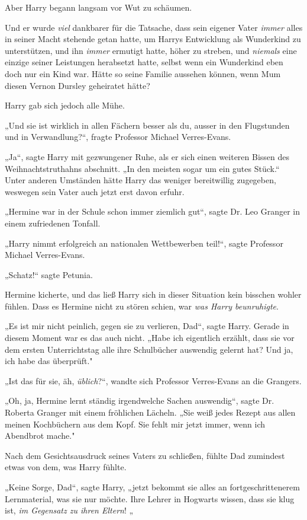 {Aber Harry begann langsam vor Wut zu schäumen.

Und er wurde \emph{viel} dankbarer für die Tatsache, dass sein eigener Vater \emph{immer} alles in seiner Macht stehende getan hatte, um Harrys Entwicklung als Wunderkind zu unterstützen, und ihn \emph{immer} ermutigt hatte, höher zu streben, und \emph{niemals} eine einzige seiner Leistungen herabsetzt hatte, selbst wenn ein Wunderkind eben doch nur ein Kind war. Hätte so seine Familie aussehen können, wenn Mum diesen Vernon Dursley geheiratet hätte?

Harry gab sich jedoch alle Mühe.

„Und sie ist wirklich in allen Fächern besser als du, ausser in den Flugstunden und in Verwandlung?“, fragte Professor Michael Verres-Evans.

„Ja“, sagte Harry mit gezwungener Ruhe, als er sich einen weiteren Bissen des Weihnachtstruthahns abschnitt. „In den meisten sogar um ein gutes Stück.“ Unter anderen Umständen hätte Harry das weniger bereitwillig zugegeben, weswegen sein Vater auch jetzt erst davon erfuhr.

„Hermine war in der Schule schon immer ziemlich gut“, sagte Dr. Leo Granger in einem zufriedenen Tonfall.

„Harry nimmt erfolgreich an nationalen Wettbewerben teil!“, sagte Professor Michael Verres-Evans.

„Schatz!“ sagte Petunia.

Hermine kicherte, und das ließ Harry sich in dieser Situation kein bisschen wohler fühlen. Dass es Hermine nicht zu stören schien, war \emph{was Harry beunruhigte}.

„Es ist mir nicht peinlich, gegen sie zu verlieren, Dad“, sagte Harry. Gerade in diesem Moment war es das auch nicht. „Habe ich eigentlich erzählt, dass sie vor dem ersten Unterrichtstag alle ihre Schulbücher auswendig gelernt hat? Und ja, ich habe das überprüft."

„Ist das für sie, äh, \emph{üblich}?“, wandte sich Professor Verres-Evans an die Grangers.

„Oh, ja, Hermine lernt ständig irgendwelche Sachen auswendig“, sagte Dr. Roberta Granger mit einem fröhlichen Lächeln. „Sie weiß jedes Rezept aus allen meinen Kochbüchern aus dem Kopf. Sie fehlt mir jetzt immer, wenn ich Abendbrot mache."

Nach dem Gesichtsausdruck seines Vaters zu schließen, fühlte Dad zumindest etwas von dem, was Harry fühlte.

„Keine Sorge, Dad“, sagte Harry, „jetzt bekommt sie alles an fortgeschrittenerem Lernmaterial, was sie nur möchte. Ihre Lehrer in Hogwarts wissen, dass sie klug ist, \emph{im Gegensatz zu ihren Eltern}! „

}
